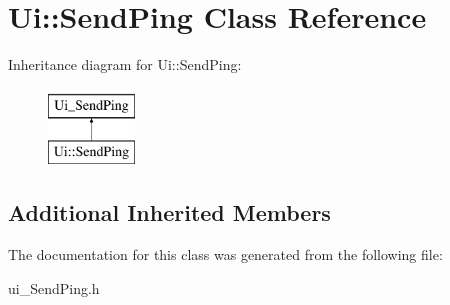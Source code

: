 \hypertarget{class_ui_1_1_send_ping}{\section{Ui\-:\-:Send\-Ping Class Reference}
\label{class_ui_1_1_send_ping}
}
Inheritance diagram for Ui\-:\-:Send\-Ping\-:\begin{figure}[H]
\begin{center}
\leavevmode
\includegraphics[height=2.000000cm]{class_ui_1_1_send_ping}
\end{center}
\end{figure}
\subsection*{Additional Inherited Members}


The documentation for this class was generated from the following file\-:\begin{DoxyCompactItemize}
\item 
ui\-\_\-\-Send\-Ping.\-h\end{DoxyCompactItemize}
